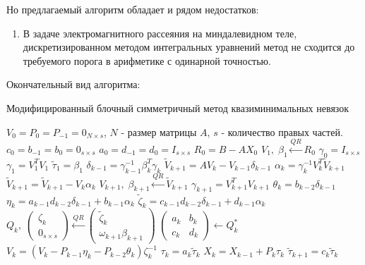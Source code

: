 Но предлагаемый алгоритм обладает и рядом недостатков:
\begin{enumerate}
    \item В задаче электромагнитного рассеяния на миндалевидном теле, дискретизированном методом интегральных уравнений \cite{stavtsev2009application} метод не сходится до требуемого порога в арифметике с одинарной точностью. 
\end{enumerate}

Окончательный вид алгоритма:
\begin{algorithm}
    \caption{Модифицированный блочный симметричный метод квазиминимальных невязок}\label{alg:bsqmr_mod}
    \begin{algorithmic}
        \State $V_0 = P_{0} = P_{-1} = 0_{N \times s}$, $N$ - размер матрицы $A$, $s$ - количество правых частей.
        \State $c_0 = b_{-1} = b_0 = 0_{s \times s}$
        \State $a_0 = d_{-1} = d_0 = I_{s \times s}$
        \State $R_0 = B - AX_0$
        \State $V_1,\; \beta_1 \xleftarrow{QR} R_0 $
        \State $\gamma_{0} = I_{s \times s}$
        \State $\gamma_{1} = V_1^T V_1$
        \State $\tilde{\tau}_1 = \beta_1 $
            \State $\delta_{k-1} = \gamma_{k-1}^{-1} \beta_k^T \gamma_k $
            \State $\tilde{V}_{k+1} = AV_k - V_{k-1} \delta_{k-1}$
            \State $\alpha_k = \gamma_k^{-1} V_k^T \tilde{V}_{k+1}$
            \State $\tilde{V}_{k+1} = \tilde{V}_{k+1} - V_k \alpha_k$
            \State $ V_{k+1},\; \beta_{k+1} \xleftarrow{QR} \tilde{V}_{k+1} $
            \State $\gamma_{k+1} = V_{k+1}^T V_{k+1}$
            \State $\theta_k = b_{k-2} \delta_{k-1}$
            \State $\eta_k = a_{k-1}d_{k-2}\delta_{k-1} + b_{k-1}\alpha_k$
            \State $\tilde{\zeta}_k = c_{k-1} d_{k-2} \delta_{k-1} + d_{k-1} \alpha_k$
            \State $ Q_k ,\; 
                    \begin{pmatrix} 
                        \zeta_k \\
                        0_{s \times s}
                    \end{pmatrix} \xleftarrow{QR} \begin{pmatrix}
                                        \tilde{\zeta}_k \\
                                        \omega_{k+1} \beta_{k+1}
                                     \end{pmatrix}$
            \State $\begin{pmatrix}
                        a_k & b_k \\
                        c_k & d_k
                    \end{pmatrix} \gets Q_k^*$
            \State $V_k = (V_k - P_{k-1}\eta_k - P_{k-2} \theta_k)\zeta_k^{-1}$
            \State $\tau_k = a_k \tilde{\tau}_k$
            \State $X_k = X_{k-1} + P_{k} \tau_{k}$
            \State $\tilde{\tau}_{k+1} = c_k \tilde{\tau}_k$
        \EndFor
    \end{algorithmic}
\end{algorithm}


\newpage
   